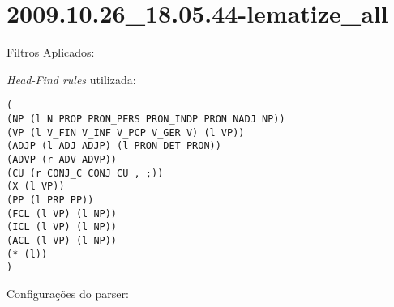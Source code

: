 \section{2009.10.26_18.05.44-lematize_all} %
\label{sec:exp:2009.10.26_18.05.44-lematize_all}

Filtros Aplicados:

\begin{itemize}
  
  \item{\emph{LematizeAll}
  
\end{itemize}

\emph{Head-Find rules} utilizada:

\scriptsize
\begin{verbatim}
(
(NP (l N PROP PRON_PERS PRON_INDP PRON NADJ NP))
(VP (l V_FIN V_INF V_PCP V_GER V) (l VP))
(ADJP (l ADJ ADJP) (l PRON_DET PRON))
(ADVP (r ADV ADVP))
(CU (r CONJ_C CONJ CU , ;))
(X (l VP))
(PP (l PRP PP))
(FCL (l VP) (l NP))
(ICL (l VP) (l NP))
(ACL (l VP) (l NP))
(* (l))
)

\end{verbatim}

\normalsize

Configurações do parser:

